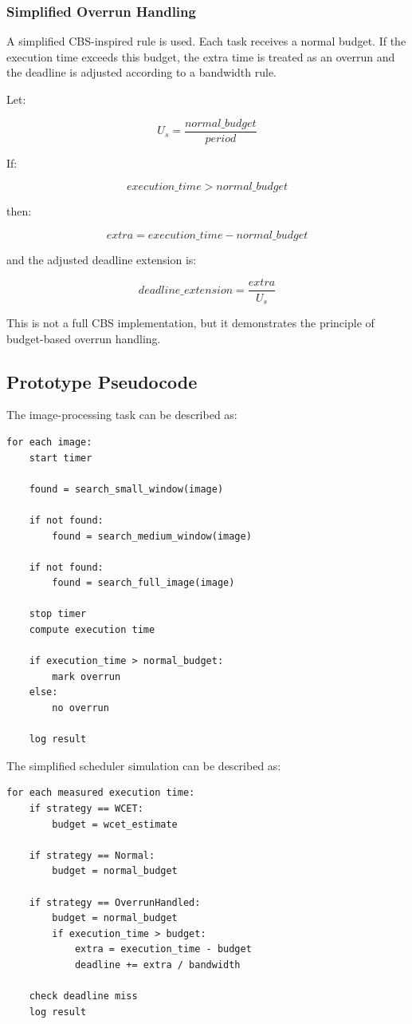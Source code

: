 \documentclass[conference]{IEEEtran}
\begin{document}
\subsubsection{Simplified Overrun Handling}

A simplified CBS-inspired rule is used. Each task receives a normal budget. If the execution time exceeds this budget, the extra time is treated as an overrun and the deadline is adjusted according to a bandwidth rule.

Let:

\[
U_s = \frac{normal\_budget}{period}
\]

If:

\[
execution\_time > normal\_budget
\]

then:

\[
extra = execution\_time - normal\_budget
\]

and the adjusted deadline extension is:

\[
deadline\_extension = \frac{extra}{U_s}
\]

This is not a full CBS implementation, but it demonstrates the principle of budget-based overrun handling.

\subsection{Prototype Pseudocode}

The image-processing task can be described as:

\begin{lstlisting}
for each image:
    start timer

    found = search_small_window(image)

    if not found:
        found = search_medium_window(image)

    if not found:
        found = search_full_image(image)

    stop timer
    compute execution time

    if execution_time > normal_budget:
        mark overrun
    else:
        no overrun

    log result
\end{lstlisting}

The simplified scheduler simulation can be described as:

\begin{lstlisting}
for each measured execution time:
    if strategy == WCET:
        budget = wcet_estimate

    if strategy == Normal:
        budget = normal_budget

    if strategy == OverrunHandled:
        budget = normal_budget
        if execution_time > budget:
            extra = execution_time - budget
            deadline += extra / bandwidth

    check deadline miss
    log result
\end{lstlisting}
\end{document}
